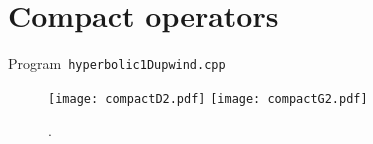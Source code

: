 \section{Compact operators}

\begin{cpplisting}
	\tiny
	\centering
	\caption{Program~\texttt{hyperbolic1Dupwind.cpp}}
	\label{code:hyperbolic1Dupwind.cpp}
\end{cpplisting}

\begin{figure}[ht!]
	\centering
	\texttt{[image: compactD2.pdf]}
	\texttt{[image: compactG2.pdf]}
	\caption{.}
\end{figure}

